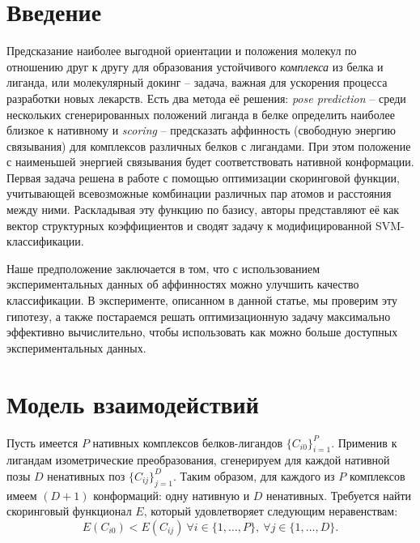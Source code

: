 \documentclass[12pt,twoside]{article}
\title
    {Оценка энергии связывания белка и маленьких молекул}
\author
    {Анастасия Грачева, Мария Кадукова, Сергей Грудинин, В.В. Стрижов} %
\begin{document}
\maketitle
\section{Введение}
Предсказание наиболее выгодной ориентации и положения молекул по отношению друг к другу для образования устойчивого \emph{комплекса} из белка и лиганда, или молекулярный докинг\cite{docking} -- задача, важная для ускорения процесса разработки новых лекарств.
Есть два метода её решения: \emph{pose prediction} -- среди нескольких сгенерированных положений лиганда в белке определить наиболее близкое к нативному и \emph{scoring} -- предсказать аффинность (свободную энергию связывания) для комплексов различных белков с лигандами. При этом положение с наименьшей энергией связывания будет соответствовать нативной конформации. Первая задача решена в работе с помощью оптимизации скоринговой функции, учитывающей всевозможные комбинации различных пар атомов и расстояния между ними. Раскладывая эту функцию по базису, авторы представляют её как вектор структурных коэффициентов и сводят задачу к модифицированной SVM-классификации.

Наше предположение заключается в том, что с использованием экспериментальных данных об аффинностях можно улучшить качество классификации. В эксперименте, описанном в данной статье, мы проверим эту гипотезу, а также постараемся решать оптимизационную задачу максимально эффективно вычислительно, чтобы использовать как можно больше доступных экспериментальных  данных.

\section{Модель взаимодействий}

Пусть имеется $P$ нативных комплексов белков-лигандов $\{C_{i0}\}_{i=1}^P$. Применив к лигандам изометрические преобразования, сгенерируем для каждой нативной позы $D$ ненативных поз $\{C_{ij}\}_{j=1}^D$. Таким образом, для каждого из $P$ комплексов имеем $(D + 1)$ конформаций: одну нативную и $D$ ненативных. Требуется найти скоринговый функционал $E$, который удовлетворяет следующим неравенствам: 
\begin{equation}\label{eq1}
E(C_{i0}) < E(C_{ij}) \ \forall i\in\{1,\dots,P\}, \ \forall j\in\{1,\dots,D\}.
\end{equation}
\end{document}
